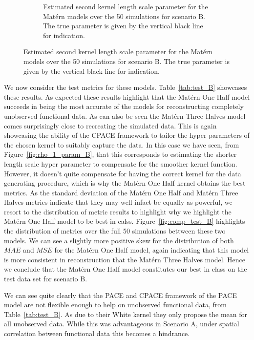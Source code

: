 \begin{figure}
\begin{subfigure}[b]{0.45\textwidth}
		\caption{Estimated second kernel length scale parameter for the Mat\'ern models over the 50 simulations for scenario B. The true parameter is given by the vertical black line for indication.}
		\label{fig:rho_2_param_B}
	\end{subfigure}
\end{figure}

We now consider the test metrics for these models.
Table~\ref{tab:test_B} showcases these results.
As expected these results highlight that the Mat\'ern One Half model succeeds in being the most accurate of the models for reconstructing completely unobserved functional data.
As can also be seen the Mat\'ern Three Halves model comes surprisingly close to recreating the simulated data.
This is again showcasing the ability of the CPACE framework to tailor the hyper parameters of the chosen kernel to suitably capture the data.
In this case we have seen, from Figure~\ref{fig:rho_1_param_B}, that this corresponds to estimating the shorter length scale hyper parameter to compensate for the smoother kernel function.
However, it doesn't quite compensate for having the correct kernel for the data generating procedure, which is why the Mat\'ern One Half kernel obtains the best metrics.
As the standard deviation of the Mat\'ern One Half and Mat\'ern Three Halves metrics indicate that they may well infact be equally as powerful, we resort to the distribution of metric results to highlight why we highlight the Mat\'ern One Half model to be best in calss.
Figure~\ref{fig:comp_test_B} highlights the distribution of metrics over the full 50 simulations bettween these two models.
We can see a slightly more positive skew for the distribution of both $MAE$ and $MSE$ for the Mat\'ern One Half model, again indicating that this model is more consistent in reconstruction that the Mat\'ern Three Halves model.
Hence we conclude that the Mat\'ern One Half model constitutes our best in class on the test data set for scenario B. 

We can see quite clearly that the PACE and CPACE framework of the PACE model are not flexible enough to help on unobserved functional data, from Table~\ref{tab:test_B}.
As due to their White kernel they only propose the mean for all unobserved data.
While this was advantageous in Scenario A, under spatial correlation between functional data this becomes a hindrance. 

